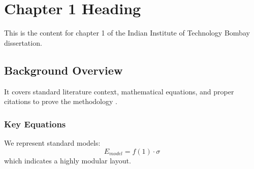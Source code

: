 \chapter{Chapter 1 Heading}
\label{ch:chapter1}
This is the content for chapter 1 of the Indian Institute of Technology Bombay dissertation.

\section{Background Overview}
It covers standard literature context, mathematical equations, and proper citations to prove the methodology \cite{texbook}.

\subsection{Key Equations}
We represent standard models:
\begin{equation}
    E_{model} = f(1) \cdot \sigma
\end{equation}
which indicates a highly modular layout.
